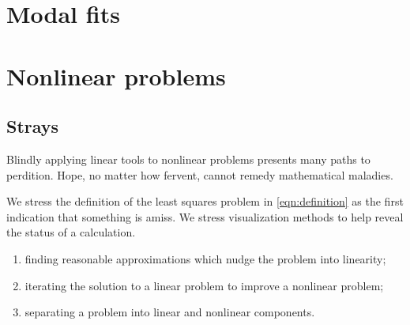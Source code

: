 \documentclass{amsbook}
\newcommand{\pathchapter}  {../chapters/}
\begin{document}
\part{\label{part:zonal}Modal fits}  %



\part{\label{part:nonlinear}Nonlinear problems}  %
\chapter{Strays}

Blindly applying linear tools to nonlinear problems presents many paths to perdition. Hope, no matter how fervent, cannot remedy mathematical maladies.

We stress the definition of the least squares problem in \eqref{eqn:definition} as the first indication that something is amiss. We stress visualization methods to help reveal the status of a calculation.
\begin{enumerate}
\item finding reasonable approximations which nudge the problem into linearity;
\item iterating the solution to a linear problem to improve a nonlinear problem; 
\item separating a problem into linear and nonlinear components.
\end{enumerate}

%
%
%
%
%  
\end{document}
